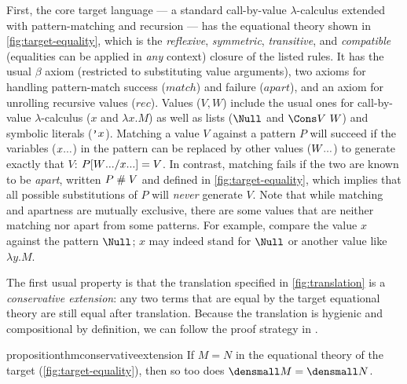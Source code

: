 First, the core target language --- a standard call-by-value $\lambda$-calculus extended with pattern-matching and recursion --- has the equational theory shown in \cref{fig:target-equality}, which is the \emph{reflexive}, \emph{symmetric}, \emph{transitive}, and \emph{compatible} (\ie equalities can be applied in \emph{any} context) closure of the listed rules.
It has the usual $\beta$ axiom (restricted to substituting value arguments), two axioms for handling pattern-match success ($\mathit{match}$) and failure ($\mathit{apart}$), and an axiom for unrolling recursive values ($\mathit{rec}$).
Values ($V, W$) include the usual ones for call-by-value $\lambda$-calculus ($x$ and $\lambda x. M$) as well as lists ($\Null$ and $\Cons V ~ W$) and symbolic literals ($\q x$).
Matching a value $V$ against a pattern $P$ will succeed if the variables ($\many{x}$) in the pattern can be replaced by other values ($\many{W}$) to generate exactly that $V$: $P\subst{\many{x}}{\many{W}} = V$.
In contrast, matching fails if the two are known to be \emph{apart}, written $P \apart V$ and defined in \cref{fig:target-equality}, which implies that all possible substitutions of $P$ will \emph{never} generate $V$.
Note that while matching and apartness are mutually exclusive, there are some values that are neither matching nor apart from some patterns.
For example, compare the value $x$ against the pattern $\Null$; $x$ may indeed stand for $\Null$ or another value like $\lambda y. M$.

The first usual property is that the translation specified in \cref{fig:translation} is a \emph{conservative extension}: any two terms that are equal by the target equational theory are still equal after translation.
Because the translation is hygienic and compositional by definition,  we can follow the proof strategy in \cite{DownenAriola2014CSCC}.

\begin{restatable}{proposition}{thmconservativeextension}
  \label{thm:conservative-extension}
  If $M = N$ in the equational theory of the target
  (\cref{fig:target-equality}), then so too does $\den{M} = \den{N}$.
\end{restatable}

